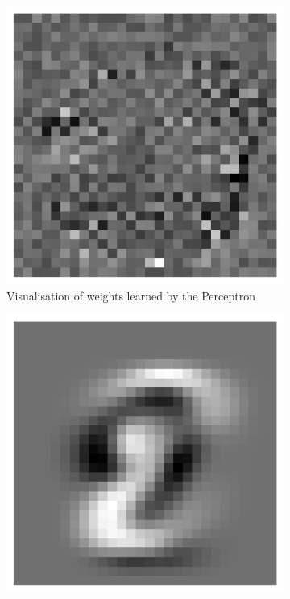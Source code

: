 \documentclass{article}
\begin{document}
\begin{figure}[h!]
    \centering
    \begin{subfigure}[t]{0.3\textwidth} %
        \centering
        \includegraphics[width=\textwidth]{./plots/plot6.png} %
        \caption{Visualisation of weights learned by the Perceptron}
        \label{fig:plot7a}
    \end{subfigure}
    \hspace{0.01\textwidth}
    \begin{subfigure}[t]{0.3\textwidth}
        \centering
        \includegraphics[width=\textwidth]{./plots/plot7.png} %

\end{subfigure}
\end{figure}
\end{document}
